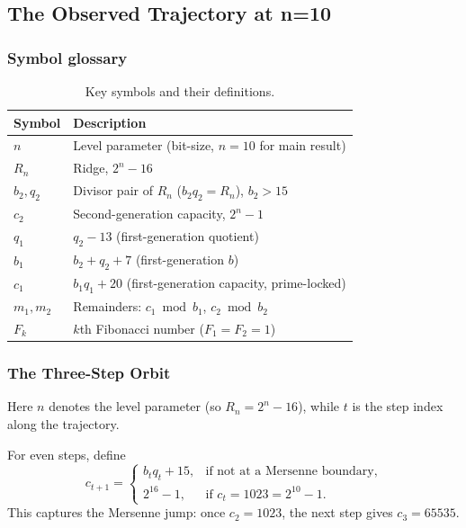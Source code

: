 \documentclass[12pt]{article}
\numberwithin{equation}{section}
\begin{document}
\subsection{The Observed Trajectory at n=10}
\subsubsection*{Symbol glossary}
\begin{table}[h]
\centering
\renewcommand{\arraystretch}{1.12}
\begin{tabular}{@{}ll@{}}
\toprule
Symbol & Description \\
\midrule
$n$ & Level parameter (bit-size, $n=10$ for main result) \\
$R_n$ & Ridge, $2^n-16$ \\
$b_2,q_2$ & Divisor pair of $R_n$ ($b_2q_2=R_n$), $b_2>15$ \\
$c_2$ & Second-generation capacity, $2^n-1$ \\
$q_1$ & $q_2-13$ (first-generation quotient) \\
$b_1$ & $b_2+q_2+7$ (first-generation $b$) \\
$c_1$ & $b_1q_1+20$ (first-generation capacity, prime-locked) \\
$m_1,m_2$ & Remainders: $c_1\!\bmod b_1$, $c_2\!\bmod b_2$ \\
$F_k$ & $k$th Fibonacci number ($F_1=F_2=1$) \\
\bottomrule
\end{tabular}
\caption{Key symbols and their definitions.}
\end{table}
\subsubsection{The Three-Step Orbit}
Here $n$ denotes the level parameter (so $R_n = 2^n - 16$), while $t$ is the step index along the trajectory.

For even steps, define
\[
  c_{t+1} =
  \begin{cases}
    b_t q_t + 15, & \text{if not at a Mersenne boundary}, \\[6pt]
    2^{16}-1, & \text{if } c_t = 1023 = 2^{10}-1.
  \end{cases}
\]
This captures the Mersenne jump: once $c_2=1023$, the next step gives $c_3=65535$.
\end{document}
